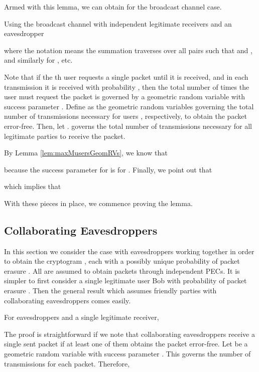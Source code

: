\documentclass[10pt,twocolumn,twoside]{IEEEtran} \newlength{\pic}
\theoremstyle{definition}
\theoremstyle{remark}
\theoremstyle{plain}
\begin{document}
Armed with this lemma, we can obtain  for the broadcast channel case.
\begin{lemma}\label{thm:3}
 Using the broadcast channel with  independent legitimate receivers and an eavesdropper
 
 where the notation  means the summation traverses over all pairs  such that  and , and similarly for , etc.
\end{lemma}
\begin{IEEEproof}
Note that if the th user requests a single packet until it is received, and in each transmission it is received with probability , then the total number of times the user must request the packet is governed by a geometric random variable with success parameter  \cite{Grimmett_ProbBook}. Define  as the geometric random variables governing the total number of transmissions necessary for users , respectively, to obtain the packet error-free. Then, let .  governs the total number of transmissions necessary for all legitimate parties to receive the packet.

By Lemma \ref{lem:maxMusersGeomRVs}, we know that

because the success parameter for  is  for . Finally, we point out that

which implies that


With these pieces in place, we commence proving the lemma.

\end{IEEEproof}

\subsection{Collaborating Eavesdroppers}
In this section we consider the case with  eavesdroppers working together in order to obtain the cryptogram , each with a possibly unique probability of packet erasure . All are assumed to obtain packets through independent PECs. It is simpler to first consider a single legitimate user Bob with probability of packet erasure . Then the general result which assumes  friendly parties with  collaborating eavesdroppers comes easily.
\begin{lemma}\label{thm:5}
 For  eavesdroppers and a single legitimate receiver,
 
\end{lemma}
\begin{IEEEproof}
 The proof is straightforward if we note that collaborating eavesdroppers receive a single sent packet if at least one of them obtains the packet error-free. Let  be a geometric random variable with success parameter . This governs the number of transmissions for each packet. Therefore,
 
\end{IEEEproof}
\end{document}
